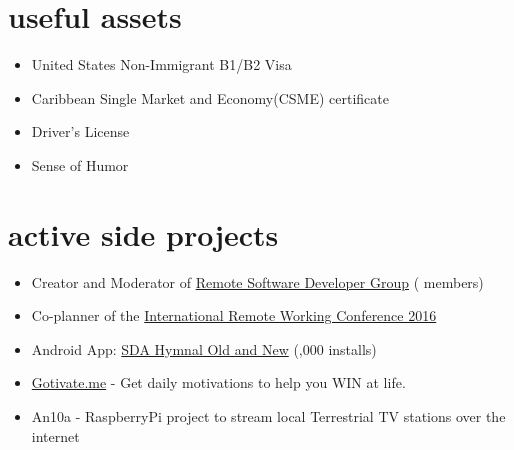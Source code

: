 \documentclass[]{friggeri-cv} %
\begin{document}

\section{useful assets}
\begin{itemize}
	\item United States Non-Immigrant B1/B2 Visa
    \item Caribbean Single Market and Economy(CSME) certificate
    \item Driver's License
    \item Sense of Humor
\end{itemize}


\section{active side projects}
\begin{itemize}
	\item Creator and Moderator of {\href{http://remotesoftwaredeveloper.com}{Remote Software Developer Group}} ( members)
    \item Co-planner of the {\href{http://remoteworkingconf.com}{International Remote Working Conference 2016}}
    \item Android App: {\href{https://play.google.com/store/apps/details?id=com.ionicframework.sdanewandoldhymnal816673&hl=en}{SDA Hymnal Old and New}} (,000 installs)
    \item {\href{http://gotivate.me}{Gotivate.me}} - Get daily motivations to help you WIN at life.
    \item An10a - RaspberryPi project to stream local Terrestrial TV stations over the internet
\end{itemize}


\end{document}
